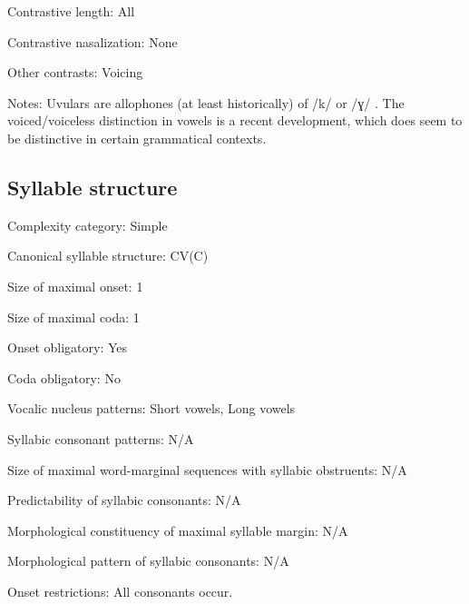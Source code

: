 {\begin{appendixdesc}
\item[Contrastive length:] All

\item[Contrastive nasalization:] None

\item[Other contrasts:] Voicing

\item[Notes:] Uvulars are allophones (at least historically) of /k/ or /ɣ/ \citep[26]{Givón2011}. The voiced/voiceless distinction in vowels is a recent development, which does seem to be distinctive in certain grammatical contexts.
\end{appendixdesc}
\subsection*{Syllable structure}
\begin{appendixdesc}

\item[Complexity category:] Simple

\item[Canonical syllable structure:] CV(C) \citep[27--28]{Givón2011}

\item[Size of maximal onset:] 1

\item[Size of maximal coda:] 1

\item[Onset obligatory:] Yes

\item[Coda obligatory:] No

\item[Vocalic nucleus patterns:] Short vowels, Long vowels

\item[Syllabic consonant patterns:] N/A

\item[Size of maximal word-marginal sequences with syllabic obstruents:] N/A

\item[Predictability of syllabic consonants:] N/A

\item[Morphological constituency of maximal syllable margin:] N/A

\item[Morphological pattern of syllabic consonants:] N/A

\item[Onset restrictions:] All consonants occur.


\end{appendixdesc}}
